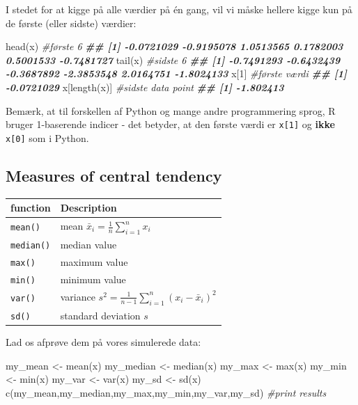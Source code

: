 \documentclass[
]{book}
\newenvironment{Shaded}{\begin{snugshade}}{\end{snugshade}}
\newcommand{\CommentTok}[1]{\textcolor[rgb]{0.56,0.35,0.01}{\textit{#1}}}
\newcommand{\DecValTok}[1]{\textcolor[rgb]{0.00,0.00,0.81}{#1}}
\newcommand{\DocumentationTok}[1]{\textcolor[rgb]{0.56,0.35,0.01}{\textbf{\textit{#1}}}}
\newcommand{\FunctionTok}[1]{\textcolor[rgb]{0.00,0.00,0.00}{#1}}
\newcommand{\NormalTok}[1]{#1}
\newcommand{\OtherTok}[1]{\textcolor[rgb]{0.56,0.35,0.01}{#1}}
\begin{document}
I stedet for at kigge på alle værdier på én gang, vil vi måske hellere kigge kun på de første (eller sidste) værdier:

\begin{Shaded}
\begin{Highlighting}[]
\FunctionTok{head}\NormalTok{(x) }\CommentTok{\#første 6}
\DocumentationTok{\#\# [1] {-}0.0721029 {-}0.9195078  1.0513565  0.1782003  0.5001533 {-}0.7481727}
\FunctionTok{tail}\NormalTok{(x) }\CommentTok{\#sidste 6}
\DocumentationTok{\#\# [1] {-}0.7491293 {-}0.6432439 {-}0.3687892 {-}2.3853548  2.0164751 {-}1.8024133}
\NormalTok{x[}\DecValTok{1}\NormalTok{] }\CommentTok{\#første værdi}
\DocumentationTok{\#\# [1] {-}0.0721029}
\NormalTok{x[}\FunctionTok{length}\NormalTok{(x)] }\CommentTok{\#sidste data point}
\DocumentationTok{\#\# [1] {-}1.802413}
\end{Highlighting}
\end{Shaded}

Bemærk, at til forskellen af Python og mange andre programmering sprog, R bruger 1-baserende indicer - det betyder, at den første værdi er \texttt{x{[}1{]}} og \textbf{ikke} \texttt{x{[}0{]}} som i Python.

\hypertarget{measures-of-central-tendency}{%
\subsection{Measures of central tendency}\label{measures-of-central-tendency}}

\begin{longtable}[]{@{}ll@{}}
\toprule
function & Description \\
\midrule
\endhead
\texttt{mean()} & mean \(\bar{x}_{i} = \frac{1}{n}\sum_{i=1}^{n} x_{i}\) \\
\texttt{median()} & median value \\
\texttt{max()} & maximum value \\
\texttt{min()} & minimum value \\
\texttt{var()} & variance \(s^2 = \frac{1}{n-1}\sum_{i=1}^{n} (x_{i} - \bar{x}_{i})^2\) \\
\texttt{sd()} & standard deviation \(s\) \\
\bottomrule
\end{longtable}

Lad os afprøve dem på vores simulerede data:

\begin{Shaded}
\begin{Highlighting}[]
\NormalTok{my\_mean }\OtherTok{\textless{}{-}} \FunctionTok{mean}\NormalTok{(x)}
\NormalTok{my\_median }\OtherTok{\textless{}{-}} \FunctionTok{median}\NormalTok{(x)}
\NormalTok{my\_max }\OtherTok{\textless{}{-}} \FunctionTok{max}\NormalTok{(x)}
\NormalTok{my\_min }\OtherTok{\textless{}{-}} \FunctionTok{min}\NormalTok{(x)}
\NormalTok{my\_var }\OtherTok{\textless{}{-}} \FunctionTok{var}\NormalTok{(x)}
\NormalTok{my\_sd }\OtherTok{\textless{}{-}} \FunctionTok{sd}\NormalTok{(x)}
\FunctionTok{c}\NormalTok{(my\_mean,my\_median,my\_max,my\_min,my\_var,my\_sd) }\CommentTok{\#print results}
\end{Highlighting}
\end{Shaded}
\end{document}

